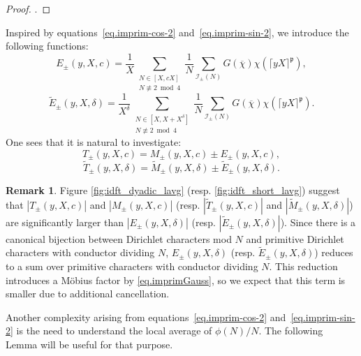 \documentclass{amsart}
\theoremstyle{definition}
\newtheorem{remark}[theorem]{Remark}
\newcommand{\prceil}{\rceil^{\mathfrak p}}
\numberwithin{equation}{section}
\begin{document}
\begin{proof}
\cite[Lemma 3.1]{IK}.
\end{proof}
Inspired by equations~\eqref{eq.imprim-cos-2} and~\eqref{eq.imprim-sin-2}, we introduce the following functions:
\begin{equation}\label{eq.Ilavanish_dyadic}
E_{\pm}(y,X,c)=\frac{1}{X}\sum_{\substack{N \in[X, cX] \\ N \not\equiv 2 \bmod 4 }} \frac{1}{N} \sum_{\mathcal{I}_\pm(N)} G(\overline{\chi}) \chi(\lceil yX \prceil),
\end{equation}
\begin{equation}\label{eq.Ilavanish_short}
\widetilde{E}_{\pm}(y,X,\delta)=\frac{1}{X^\delta}\sum_{\substack{N \in[X, X+X^\delta] \\ N \not\equiv 2\bmod 4}} \frac{1}{N} \sum_{\mathcal{I}_\pm(N)} G(\overline{\chi}) \chi(\lceil yX \prceil).
\end{equation}
One sees that it is natural to investigate:
\begin{equation}\label{eq.Murm}
T_{\pm}(y,X,c)=M_{\pm}(y,X,c)\pm E_{\pm}(y,X,c), 
\end{equation} 
\begin{equation}\label{eq.Murm2}
\widetilde{T}_{\pm}(y,X,\delta)=\widetilde{M}_{\pm}(y,X,\delta)\pm\widetilde{E}_{\pm}(y,X,\delta).
\end{equation}
\begin{remark}
Figure \ref{fig:idft_dyadic_lavg} (resp. \ref{fig:idft_short_lavg}) suggest that $|T_\pm(y,X,c)|$ and $|M_\pm(y,X,c)|$ (resp.  $|\widetilde{T}_\pm(y,X,c)|$ and $|\widetilde{M}_\pm(y,X,\delta)|$) are significantly larger than $|E_\pm(y, X, \delta)|$ (resp. $|\widetilde{E}_\pm(y,X,\delta)|$).
Since there is a canonical bijection between Dirichlet characters mod $N$ and primitive Dirichlet characters with conductor dividing $N$, $E_\pm(y, X, \delta)$ (resp. $\widetilde{E}_\pm(y,X,\delta)$) reduces to a sum over primitive characters with conductor dividing $N$. 
This reduction introduces a M\"obius factor by \eqref{eq.imprimGauss}, so we expect that this term is smaller due to additional cancellation. 
\end{remark}
Another complexity arising from equations~\eqref{eq.imprim-cos-2} and~\eqref{eq.imprim-sin-2} is the need to understand the local average of $\phi(N)/N$. 
The following Lemma will be useful for that purpose.
\end{document}
